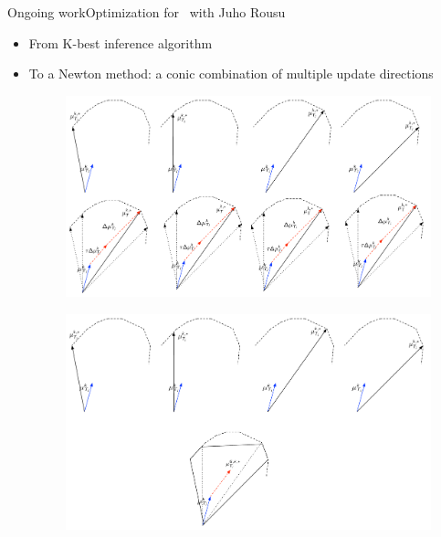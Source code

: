 \documentclass[first=dgreen,second=purple,logo=red]{aaltoslides}
\begin{document}
%
\begin{frame}{Ongoing work}{Optimization for \rta\ with Juho Rousu}
	\begin{itemize}\footnotesize
		\item From K-best inference algorithm
		\item To a Newton method: a conic combination of multiple update directions
		\only<1>
		{\begin{figure}
			\begin{center}
				\includegraphics[scale=0.25]{./best_update.pdf}
			\end{center}
		\end{figure}}
		{\begin{figure}
			\begin{center}
				\includegraphics[scale=0.25]{./multiple_update.pdf}
			\end{center}
		\end{figure}}
	\end{itemize}
\end{frame}
\end{document}
